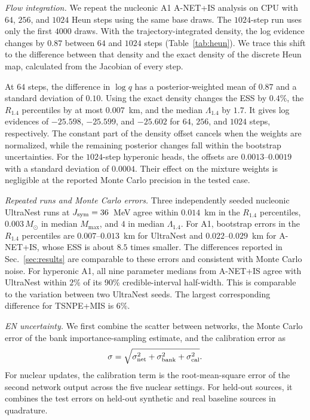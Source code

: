 \documentclass[aps,prd,twocolumn,superscriptaddress,nofootinbib,longbibliography]{revtex4-2}
\begin{document}
\emph{Flow integration.} We repeat the nucleonic A1 A-NET+IS analysis on CPU
with $64$, $256$, and $1024$ Heun steps using the same base draws. The
$1024$-step run uses only the first $4000$ draws. With the
trajectory-integrated density, the log evidence changes by $0.87$ between $64$
and $1024$ steps (Table~\ref{tab:heun}). We trace this shift to the difference
between that density and the exact density of the discrete Heun map,
calculated from the Jacobian of every step.

At $64$ steps, the difference in $\log q$ has a posterior-weighted mean of
$0.87$ and a standard deviation of $0.10$. Using the exact density changes the
ESS by $0.4\%$, the $R_{1.4}$ percentiles by at most $0.007$~km, and the median
$\Lambda_{1.4}$ by $1.7$. It gives log evidences of $-25.598$, $-25.599$, and
$-25.602$ for $64$, $256$, and $1024$ steps, respectively. The constant part of
the density offset cancels when the weights are normalized, while the
remaining posterior changes fall within the bootstrap uncertainties. For the
$1024$-step hyperonic heads, the offsets are $0.0013$--$0.0019$ with a standard
deviation of $0.0004$. Their effect on the mixture weights is negligible at the
reported Monte Carlo precision in the tested case.

\emph{Repeated runs and Monte Carlo errors.} Three independently seeded
nucleonic UltraNest runs at $J_{\rm sym}=36$~MeV agree within $0.014$~km in the
$R_{1.4}$ percentiles, $0.003\,M_\odot$ in median $M_{\max}$, and $4$ in median
$\Lambda_{1.4}$. For A1, bootstrap errors in the $R_{1.4}$ percentiles are
$0.007$--$0.013$~km for UltraNest and $0.022$--$0.029$~km for A-NET+IS, whose
ESS is about $8.5$ times smaller. The differences reported in
Sec.~\ref{sec:results} are comparable to these errors and consistent with Monte
Carlo noise. For hyperonic A1, all nine parameter medians from A-NET+IS agree
with UltraNest within $2\%$ of its 90\% credible-interval half-width. This is
comparable to the variation between two UltraNest seeds. The largest
corresponding difference for TSNPE+MIS is $6\%$.

\emph{EN uncertainty.} We first combine the scatter between networks, the Monte
Carlo error of the bank importance-sampling estimate, and the calibration error
as
\[
\sigma=\sqrt{\sigma_{\rm net}^{2}+\sigma_{\rm bank}^{2}+\sigma_{\rm cal}^{2}}.
\]
For nuclear updates, the calibration term is the root-mean-square error of the
second network output across the five nuclear settings. For held-out sources,
it combines the test errors on held-out synthetic and real baseline sources in
quadrature.
\end{document}
